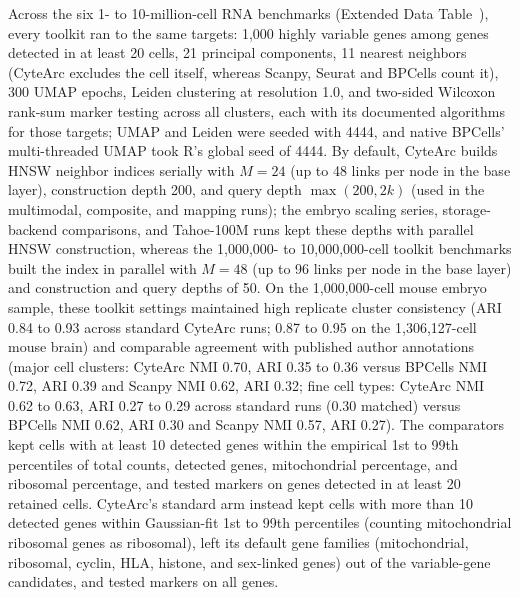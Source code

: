 \label{note:Comparator workflow parameters}

Across the six 1- to 10-million-cell RNA benchmarks (Extended Data Table~), every toolkit ran to the same targets: 1,000 highly variable genes among genes detected in at least 20 cells, 21 principal components, 11 nearest neighbors (CyteArc excludes the cell itself, whereas Scanpy, Seurat and BPCells count it), 300 UMAP epochs, Leiden clustering at resolution 1.0, and two-sided Wilcoxon rank-sum marker testing across all clusters, each with its documented algorithms for those targets; UMAP and Leiden were seeded with 4444, and native BPCells' multi-threaded UMAP took R's global seed of 4444. By default, CyteArc builds HNSW neighbor indices serially with $M = 24$ (up to 48 links per node in the base layer), construction depth 200, and query depth $\max(200, 2k)$ (used in the multimodal, composite, and mapping runs); the embryo scaling series, storage-backend comparisons, and Tahoe-100M runs kept these depths with parallel HNSW construction, whereas the 1,000,000- to 10,000,000-cell toolkit benchmarks built the index in parallel with $M = 48$ (up to 96 links per node in the base layer) and construction and query depths of 50. On the 1,000,000-cell mouse embryo sample, these toolkit settings maintained high replicate cluster consistency (ARI 0.84 to 0.93 across standard CyteArc runs; 0.87 to 0.95 on the 1,306,127-cell mouse brain) and comparable agreement with published author annotations (major cell clusters: CyteArc NMI 0.70, ARI 0.35 to 0.36 versus BPCells NMI 0.72, ARI 0.39 and Scanpy NMI 0.62, ARI 0.32; fine cell types: CyteArc NMI 0.62 to 0.63, ARI 0.27 to 0.29 across standard runs (0.30 matched) versus BPCells NMI 0.62, ARI 0.30 and Scanpy NMI 0.57, ARI 0.27). The comparators kept cells with at least 10 detected genes within the empirical 1st to 99th percentiles of total counts, detected genes, mitochondrial percentage, and ribosomal percentage, and tested markers on genes detected in at least 20 retained cells. CyteArc's standard arm instead kept cells with more than 10 detected genes within Gaussian-fit 1st to 99th percentiles (counting mitochondrial ribosomal genes as ribosomal), left its default gene families (mitochondrial, ribosomal, cyclin, HLA, histone, and sex-linked genes) out of the variable-gene candidates, and tested markers on all genes.

